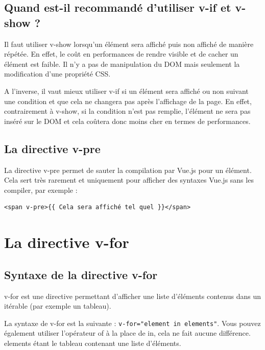 \documentclass{article}
\begin{document}
\subsection{Quand est-il recommandé d'utiliser {\color{monOrange}v-if} et {\color{monOrange}v-show} ?}
Il faut utiliser {\color{monOrange}v-show} lorsqu'un élément sera affiché puis non affiché de manière répétée. En effet, le coût en performances de rendre visible et de cacher un élément est faible. Il n'y a pas de manipulation du DOM mais seulement la modification d'une propriété CSS.

A l'inverse, il vaut mieux utiliser {\color{monOrange}v-if} si un élément sera affiché ou non suivant une condition et que cela ne changera pas après l'affichage de la page. En effet, contrairement à v-show, si la condition n'est pas remplie, l'élément ne sera pas inséré sur le DOM et cela coûtera donc moins cher en termes de performances.

\subsection{La directive {\color{monOrange}v-pre}}
La directive {\color{monOrange}v-pre} permet de sauter la compilation par {\color{monOrange}Vue.js} pour un élément. Cela sert très rarement et uniquement pour afficher des syntaxes {\color{monOrange}Vue.js} sans les compiler, par exemple :
\begin{verbatim}
<span v-pre>{{ Cela sera affiché tel quel }}</span>
\end{verbatim}


\section{La directive v-for}
\subsection{Syntaxe de la directive {\color{monOrange}v-for}}
{\color{monOrange}v-for} est une directive permettant d'afficher une liste d'éléments contenus dans un itérable (par exemple un tableau).

La syntaxe de {\color{monOrange}v-for} est la suivante : {\tt v-for="element in elements"}. Vous pouvez également utiliser l'opérateur {\color{monOrange}of} à la place de {\color{monOrange}in}, cela ne fait aucune différence. {\color{monOrange}elements} étant le tableau contenant une liste d'éléments.
\end{document}
